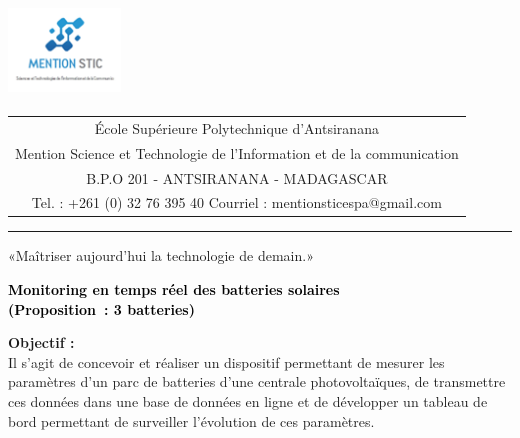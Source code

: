 
	\begin{minipage}{0.15\linewidth}		
		\begin{flushleft}
			\includegraphics[width=3cm,height=2.5cm]{./img/stic.png}
		\end{flushleft}
	\end{minipage}
	\hfill
	\begin{minipage}{0.85\linewidth}		
		\begin{center}
			\begin{tabular}{c}				
				École Supérieure Polytechnique d'Antsiranana \\
				Mention Science et Technologie de l'Information et de la communication \\
				B.P.O 201 - ANTSIRANANA - MADAGASCAR \\
				Tel. : +261 (0) 32 76 395 40 Courriel : mentionsticespa@gmail.com \\
			\end{tabular}
		\end{center}		
	\end{minipage}
	\hfill	
	\rule{17cm}{0.1mm}
	\begin{flushright}
		 «Maîtriser aujourd'hui la technologie de demain.»
	\end{flushright}


	\begin{center}
		\textcolor{black}{\large{\textbf{Monitoring en temps réel des batteries solaires
}}} \\ \vspace{0.4cm}
		\textcolor{black}{\large{\textbf{(Proposition : 3 batteries)}}} \\
		
	\end{center}

	\begin{normalsize}
		\noindent\textbf{Objectif :} \\
		
		\indent Il s’agit de concevoir et réaliser un dispositif permettant de mesurer les paramètres d’un parc de batteries d’une centrale photovoltaïques, de transmettre ces données dans une base de données en ligne et de développer un tableau de bord permettant de surveiller l’évolution de ces paramètres.
\\
		
	\end{normalsize}


